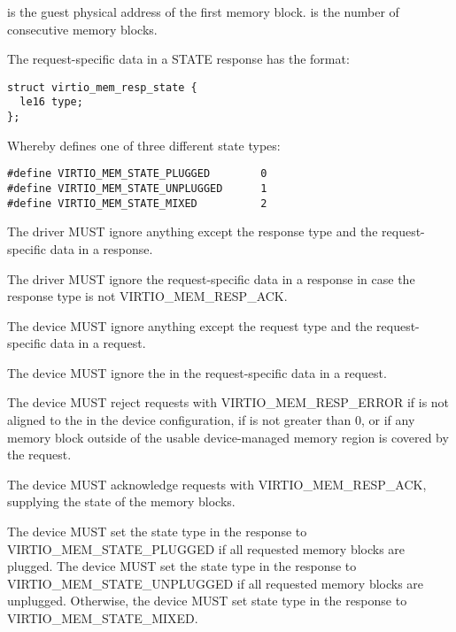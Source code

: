  is the guest physical address of the first memory block.
 is the number of consecutive memory blocks.

The request-specific data in a STATE response has the format:

\begin{lstlisting}
struct virtio_mem_resp_state {
  le16 type;
};
\end{lstlisting}

Whereby  defines one of three different state types:

\begin{lstlisting}
#define VIRTIO_MEM_STATE_PLUGGED        0
#define VIRTIO_MEM_STATE_UNPLUGGED      1
#define VIRTIO_MEM_STATE_MIXED          2
\end{lstlisting}


The driver MUST ignore anything except the response type and the
request-specific data in a response.

The driver MUST ignore the request-specific data in a response in case the
response type is not VIRTIO_MEM_RESP_ACK.


The device MUST ignore anything except the request type and the
request-specific data in a request.

The device MUST ignore the  in the request-specific data in
a request.

The device MUST reject requests with VIRTIO_MEM_RESP_ERROR if 
is not aligned to the  in the device configuration, if
 is not greater than 0, or if any memory block outside of
the usable device-managed memory region is covered by the request.

The device MUST acknowledge requests with VIRTIO_MEM_RESP_ACK, supplying
the state of the memory blocks.

The device MUST set the state type in the response to
VIRTIO_MEM_STATE_PLUGGED if all requested memory blocks are plugged.  The
device MUST set the state type in the response to
VIRTIO_MEM_STATE_UNPLUGGED if all requested memory blocks are unplugged.
Otherwise, the device MUST set state type in the response to
VIRTIO_MEM_STATE_MIXED.
